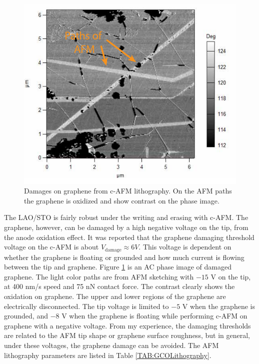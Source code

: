\documentclass[pdflatex, sectionletters, 12pt]{pittetd}    %
\begin{document}
\begin{figure}[h!]
	\centering
	\includegraphics[width=.7\textwidth]{Drawing/GrapheneDamages.pdf}
	\caption{Damages on graphene from c-AFM lithography. On the AFM paths the graphene is oxidized and show contrast on the phase image.}
	\label{FIG:GrapheneDamages}
\end{figure}

The LAO/STO is fairly robust under the writing and erasing with c-AFM. The graphene, however, can be damaged by a high negative voltage on the tip, from the anode oxidation effect\cite{alaboson2011conductive, byun2011nanoscale}. It was reported\cite{alaboson2011conductive} that the graphene damaging threshold voltage on the c-AFM is about $V_{\mathrm{damage}} \approx 6 V$. This voltage is dependent on whether the graphene is floating or grounded and how much current is flowing between the tip and graphene. Figure \ref{FIG:GrapheneDamages} is an AC phase image of damaged graphene. The light color paths are from AFM sketching with $-15$ V on the tip, at 400 nm/s speed and 75 nN contact force. The contrast clearly shows the oxidation on graphene. The upper and lower regions of the graphene are electrically disconnected. The tip voltage is limited to $-5$ V when the graphene is grounded, and $-8$ V when the graphene is floating while performing c-AFM on graphene with a negative voltage. From my experience, the damaging thresholds are related to the AFM tip shape or graphene surface roughness, but in general, under these voltages, the graphene damage can be avoided. The AFM lithography parameters are listed in Table \ref{TAB:GCOLithography}.
\end{document}
